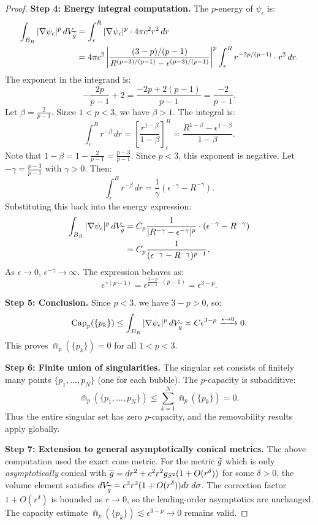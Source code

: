 \begin{proof}
\textbf{Step 4: Energy integral computation.}
The $p$-energy of $\psi_\epsilon$ is:
\begin{align*}
    \int_{B_R} |\nabla \psi_\epsilon|^p \, dV_{\widetilde{g}} &= \int_\epsilon^R |\nabla \psi_\epsilon|^p \cdot 4\pi c^2 r^2 \, dr \\
    &= 4\pi c^2 \left| \frac{(3-p)/(p-1)}{R^{(p-3)/(p-1)} - \epsilon^{(p-3)/(p-1)}} \right|^p \int_\epsilon^R r^{-2p/(p-1)} \cdot r^2 \, dr.
\end{align*}
The exponent in the integrand is:
\[
    -\frac{2p}{p-1} + 2 = \frac{-2p + 2(p-1)}{p-1} = \frac{-2}{p-1}.
\]
Let $\beta = \frac{2}{p-1}$. Since $1 < p < 3$, we have $\beta > 1$. The integral is:
\[
    \int_\epsilon^R r^{-\beta} \, dr = \left[ \frac{r^{1-\beta}}{1-\beta} \right]_\epsilon^R = \frac{R^{1-\beta} - \epsilon^{1-\beta}}{1-\beta}.
\]
Note that $1-\beta = 1 - \frac{2}{p-1} = \frac{p-3}{p-1}$. Since $p < 3$, this exponent is negative. Let $-\gamma = \frac{p-3}{p-1}$ with $\gamma > 0$. Then:
\[
    \int_\epsilon^R r^{-\beta} \, dr = \frac{1}{\gamma} (\epsilon^{-\gamma} - R^{-\gamma}).
\]
Substituting this back into the energy expression:
\begin{align*}
    \int_{B_R} |\nabla \psi_\epsilon|^p \, dV_{\widetilde{g}} &= C_p \frac{1}{|R^{-\gamma} - \epsilon^{-\gamma}|^p} \cdot (\epsilon^{-\gamma} - R^{-\gamma}) \\
    &= C_p \frac{1}{(\epsilon^{-\gamma} - R^{-\gamma})^{p-1}}.
\end{align*}
As $\epsilon \to 0$, $\epsilon^{-\gamma} \to \infty$. The expression behaves as:
\[
    \epsilon^{\gamma(p-1)} = \epsilon^{\frac{3-p}{p-1} \cdot (p-1)} = \epsilon^{3-p}.
\]

\textbf{Step 5: Conclusion.}
Since $p < 3$, we have $3 - p > 0$, so:
\[
    \text{Cap}_p(\{p_k\}) \le \int_{B_R} |\nabla \psi_\epsilon|^p \, dV_{\widetilde{g}} \asymp C \epsilon^{3-p} \xrightarrow{\epsilon \to 0} 0.
\]
This proves $\Cap_p(\{p_k\}) = 0$ for all $1 < p < 3$.

\textbf{Step 6: Finite union of singularities.}
The singular set consists of finitely many points $\{p_1, \ldots, p_N\}$ (one for each bubble). The $p$-capacity is subadditive:
\[
    \Cap_p(\{p_1, \ldots, p_N\}) \le \sum_{k=1}^N \Cap_p(\{p_k\}) = 0.
\]
Thus the entire singular set has zero $p$-capacity, and the removability results apply globally.

\textbf{Step 7: Extension to general asymptotically conical metrics.}
The above computation used the exact cone metric. For the metric $\widetilde{g}$ which is only \emph{asymptotically} conical with $\widetilde{g} = dr^2 + c^2 r^2 g_{S^2}(1 + O(r^\delta))$ for some $\delta > 0$, the volume element satisfies $dV_{\widetilde{g}} = c^2 r^2 (1 + O(r^\delta)) dr \, d\sigma$. The correction factor $1 + O(r^\delta)$ is bounded as $r \to 0$, so the leading-order asymptotics are unchanged. The capacity estimate $\Cap_p(\{p_k\}) \lesssim \epsilon^{3-p} \to 0$ remains valid.
\end{proof}

